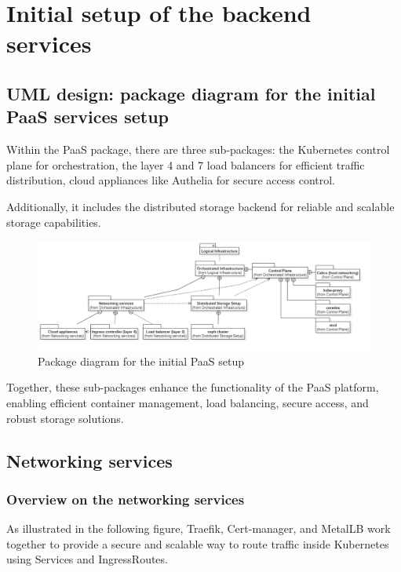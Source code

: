 \section{Initial setup of the backend services }
\subsection{UML design: package diagram for the initial PaaS services setup}

Within the PaaS package, there are three sub-packages: the Kubernetes control plane for orchestration, the layer 4 and 7 load balancers for efficient traffic distribution, cloud appliances like Authelia for secure access control.

Additionally, it includes the distributed storage backend for reliable and scalable storage capabilities.

\begin{figure}[H]\centering
\includegraphics[width=1.0\textwidth,angle=00]{assets/f21.png}
\caption{ Package diagram for the initial PaaS setup }
\label{fig:package diagram for the initial PaaS setup}
\end{figure}

Together, these sub-packages enhance the functionality of the PaaS platform, enabling efficient container management, load balancing, secure access, and robust storage solutions.

\newpage

\subsection{Networking services}

\subsubsection{Overview on the networking services}

As illustrated in the following figure, Traefik, Cert-manager, and MetalLB work together to provide a secure and scalable way to route traffic inside Kubernetes using Services and IngressRoutes.

